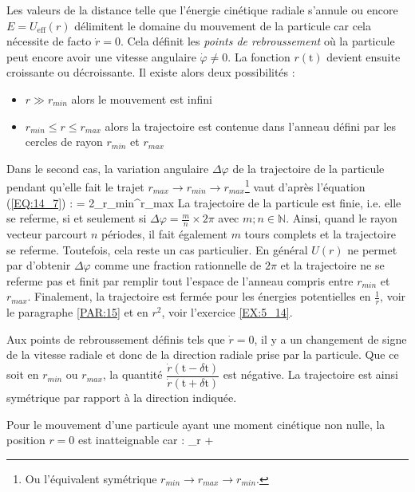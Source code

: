 Les valeurs de la distance telle que l'\'energie cin\'etique radiale s'annule ou encore $E = U_{\mathrm{eff}}(r)$ d\'elimitent le domaine du mouvement de la particule car cela n\'ecessite de facto $\dot{r} = 0$. Cela d\'efinit les \emph{points de rebroussement} o\`u la particule peut encore avoir une vitesse angulaire $\dot{\varphi}\neq 0$. La fonction $r(\mathrm{t})$ devient ensuite croissante ou d\'ecroissante. Il existe alors deux possibilit\'es :
\begin{itemize}
	\item $r \gg r_{min}$ alors le mouvement est infini
	\item $r_{min} \leqslant r \leqslant r_{max}$ alors la trajectoire est contenue dans l'anneau d\'efini par les cercles de rayon $r_{min}$ et $r_{max}$
\end{itemize}
Dans le second cas, la variation angulaire $\Delta\varphi$ de la trajectoire de la particule pendant qu'elle fait le trajet $r_{max} \rightarrow r_{min} \rightarrow r_{max}$\footnote{Ou l'\'equivalent sym\'etrique $r_{min} \rightarrow r_{max} \rightarrow r_{min}$.} vaut d'apr\`es l'\'equation (\ref{EQ:14_7}) :
\be
	\Delta\varphi = 2\int_{r_{min}}^{r_{max}}{} \label{EQ:14_10}
\ee
La trajectoire de la particule est finie, i.e. elle se referme, si et seulement si $\Delta\varphi = \frac{m}{n}\times 2\pi$ avec ${m;n}\in\mathbb{N}$. Ainsi, quand le rayon vecteur parcourt $n$ p\'eriodes, il fait \'egalement $m$ tours complets et la trajectoire se referme. Toutefois, cela reste un cas particulier. En g\'en\'eral $U(r)$ ne permet par d'obtenir $\Delta\varphi$ comme une fraction rationnelle de $2\pi$ et la trajectoire ne se referme pas et finit par remplir tout l'espace de l'anneau compris entre $r_{min}$ et $r_{max}$. Finalement, la trajectoire est ferm\'ee pour les \'energies potentielles en $\frac{1}{r}$, voir le paragraphe \ref{PAR:15} et en $r^{2}$, voir l'exercice \ref{EX:5_14}.

Aux points de rebroussement d\'efinis tels que $\dot{r} = 0$, il y a un changement de signe de la vitesse radiale et donc de la direction radiale prise par la particule. Que ce soit en $r_{min}$ ou $r_{max}$, la quantit\'e $\dfrac{\dot{r}(\mathrm{t} - \delta\mathrm{t})}{\dot{r}(\mathrm{t} + \delta\mathrm{t})}$ est n\'egative. La trajectoire est ainsi sym\'etrique par rapport \`a la direction indiqu\'ee.

Pour le mouvement d'une particule ayant une moment cin\'etique non nulle, la position $r=0$ est inatteignable car :
\be
	\lim_{r} \rightarrow +\infty
\ee

